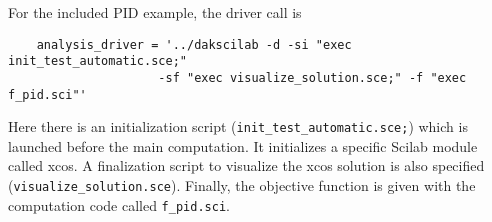 For the included PID example, the driver call is 
\begin{small}
\begin{verbatim}
    analysis_driver = '../dakscilab -d -si "exec init_test_automatic.sce;"
                     -sf "exec visualize_solution.sce;" -f "exec f_pid.sci"'
\end{verbatim}
\end{small}

Here there is an initialization script
(\texttt{init\_test\_automatic.sce;}) which is launched before the
main computation. It initializes a specific Scilab module called
xcos. A finalization script to visualize the xcos solution is also
specified (\texttt{visualize\_solution.sce}). Finally, the objective
function is given with the computation code called
\texttt{f\_pid.sci}.



